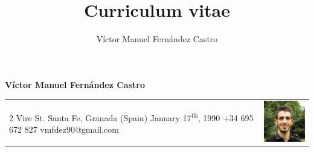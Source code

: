\documentclass[12pt,a4paper]{article}
\title{Curriculum vitae}
\author{Víctor Manuel Fernández Castro}
\begin{document}
	\large
	
	\begin{center}
		\textbf{Víctor Manuel Fernández Castro}
	\end{center}
	
	\normalsize
	\centering

	\begin{tabular}{m{}m{}}
		2 Vire St. \newline
		Santa Fe, Granada (Spain) \newline
		January 17\textsuperscript{th}, 1990 \newline
		\newline
		+34 695 672 827 \newline
		vmfdez90@gmail.com & \includegraphics[width=3cm]{photo}
	\end{tabular}
	
	
\end{document}
